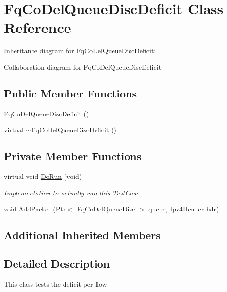\hypertarget{classFqCoDelQueueDiscDeficit}{}\section{Fq\+Co\+Del\+Queue\+Disc\+Deficit Class Reference}
\label{classFqCoDelQueueDiscDeficit}


Inheritance diagram for Fq\+Co\+Del\+Queue\+Disc\+Deficit\+:


Collaboration diagram for Fq\+Co\+Del\+Queue\+Disc\+Deficit\+:
\subsection*{Public Member Functions}
\begin{DoxyCompactItemize}
\item 
\hyperlink{classFqCoDelQueueDiscDeficit_af7f4728ac0851379941c1cc979cf9aaf}{Fq\+Co\+Del\+Queue\+Disc\+Deficit} ()
\item 
virtual \hyperlink{classFqCoDelQueueDiscDeficit_a58900bee333ba9abba49e31c0f727746}{$\sim$\+Fq\+Co\+Del\+Queue\+Disc\+Deficit} ()
\end{DoxyCompactItemize}
\subsection*{Private Member Functions}
\begin{DoxyCompactItemize}
\item 
virtual void \hyperlink{classFqCoDelQueueDiscDeficit_a9172161f28767de8a6893a8e0e320538}{Do\+Run} (void)
\begin{DoxyCompactList}\small\item\em Implementation to actually run this Test\+Case. \end{DoxyCompactList}\item 
void \hyperlink{classFqCoDelQueueDiscDeficit_a366b7108078d16452276b4be0b679ac9}{Add\+Packet} (\hyperlink{classns3_1_1Ptr}{Ptr}$<$ \hyperlink{classns3_1_1FqCoDelQueueDisc}{Fq\+Co\+Del\+Queue\+Disc} $>$ queue, \hyperlink{classns3_1_1Ipv4Header}{Ipv4\+Header} hdr)
\end{DoxyCompactItemize}
\subsection*{Additional Inherited Members}


\subsection{Detailed Description}
This class tests the deficit per flow 

